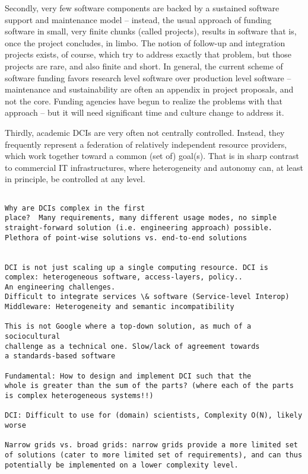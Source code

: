 \documentclass[a4paper,12pt]{article}
\begin{document}
  Secondly, very few software components are backed by a sustained
  software support and maintenance model -- instead, the usual
  approach of funding software in small, very finite chunks (called
  projects), results in software that is, once the project concludes,
  in limbo.  The notion of follow-up and integration projects exists,
  of course, which try to address exactly that problem, but those
  projects are rare, and also finite and short.  In general, the
  current scheme of software funding favors research level software
  over production level software -- maintenance and sustainability are
  often an appendix in project proposals, and not the core.  Funding
  agencies have begun to realize the problems with that approach --
  but it will need significant time and culture change to address it.

  Thirdly, academic DCIs are very often not centrally controlled.
  Instead, they frequently represent a federation of relatively
  independent resource providers, which work together toward a common
  (set of) goal(s).  That is in sharp contrast to commercial IT
  infrastructures, where heterogeneity and autonomy can, at least
  in principle, be controlled at any level.



  



\begin{verbatim}

Why are DCIs complex in the first
place?  Many requirements, many different usage modes, no simple
straight-forward solution (i.e. engineering approach) possible.
Plethora of point-wise solutions vs. end-to-end solutions
 

DCI is not just scaling up a single computing resource. DCI is
complex: heterogeneous software, access-layers, policy.. 
An engineering challenges. 
Difficult to integrate services \& software (Service-level Interop)
Middleware: Heterogeneity and semantic incompatibility

This is not Google where a top-down solution, as much of a sociocultural
challenge as a technical one. Slow/lack of agreement towards
a standards-based software
 
Fundamental: How to design and implement DCI such that the
whole is greater than the sum of the parts? (where each of the parts
is complex heterogeneous systems!!)
 
DCI: Difficult to use for (domain) scientists, Complexity O(N), likely worse

Narrow grids vs. broad grids: narrow grids provide a more limited set
of solutions (cater to more limited set of requirements), and can thus
potentially be implemented on a lower complexity level.

\end{verbatim}
\end{document}
